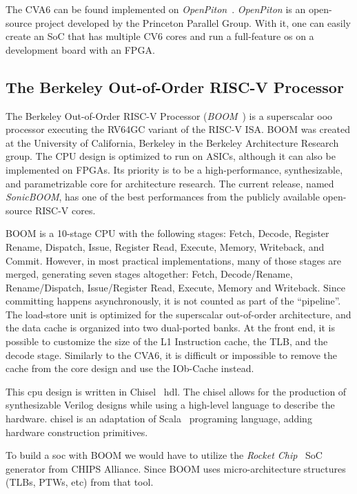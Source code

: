 The CVA6 can be found implemented on \textit{OpenPiton}~\cite{Balkind:2016:OOS:2872362.2872414}. \textit{OpenPiton} is an open-source project developed by the Princeton Parallel Group. With it, one can easily create an SoC that has multiple CV6 cores and run a full-feature \acrfull{os} on a development board with an FPGA.

\subsection{The Berkeley Out-of-Order RISC-V Processor}
The Berkeley Out-of-Order RISC-V Processor (\textit{BOOM}~\cite{zhaosonicboom}) is a superscalar \acrfull{ooo} processor executing the RV64GC variant of the RISC-V ISA. BOOM was created at the University of California, Berkeley in the Berkeley Architecture Research group. The CPU design is optimized to run on ASICs, although it can also be implemented on FPGAs. Its priority is to be a high-performance, synthesizable, and parametrizable core for architecture research. The current release, named \textit{SonicBOOM}, has one of the best performances from the publicly available open-source RISC-V cores.

BOOM is a 10-stage CPU with the following stages: Fetch, Decode, Register Rename, Dispatch, Issue, Register Read, Execute, Memory, Writeback, and Commit. However, in most practical implementations, many of those stages are merged, generating seven stages altogether: Fetch, Decode/Rename, Rename/Dispatch, Issue/Register Read, Execute, Memory and Writeback. Since committing happens asynchronously, it is not counted as part of the \enquote{pipeline}. The load-store unit is optimized for the superscalar out-of-order architecture, and the data cache is organized into two dual-ported banks. At the front end, it is possible to customize the size of the L1 Instruction cache, the TLB, and the decode stage. Similarly to the CVA6, it is difficult or impossible to remove the cache from the core design and use the IOb-Cache instead.

This \acrshort{cpu} design is written in Chisel~\cite{bachrach2012chisel} \acrfull{hdl}. The \acrfull{chisel} allows for the production of synthesizable Verilog designs while using a high-level language to describe the hardware. \acrshort{chisel} is an adaptation of Scala~\cite{odersky2004scala} programing language, adding hardware construction primitives.

To build a \acrfull{soc} with BOOM we would have to utilize the \textit{Rocket Chip}~\cite{asanovic2016rocket} SoC generator from CHIPS Alliance. Since BOOM uses micro-architecture structures (TLBs, PTWs, etc) from that tool.

